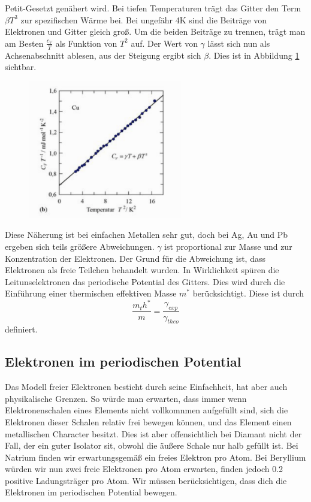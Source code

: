 \documentclass[11pt]{article}
\begin{document}
Petit-Gesetzt genähert wird. Bei tiefen Temperaturen trägt das Gitter den Term
$\beta T^3$ zur spezifischen Wärme bei. Bei ungefähr 4K sind die Beiträge von
Elektronen und Gitter gleich groß. Um die beiden Beiträge zu trennen, trägt man
am Besten $\frac{c_V}{T}$ als Funktion von $T^2$ auf. Der Wert von $\gamma$
lässt sich nun als Achsenabschnitt ablesen, aus der Steigung ergibt sich
$\beta$. Dies ist in Abbildung \ref{fig:spezifische2} sichtbar.
\begin{figure}[h]
\includegraphics[width=0.6\textwidth]{spezifische2}
\centering
\label{fig:spezifische2}
\end{figure}
Diese Näherung ist bei einfachen Metallen sehr gut, doch bei Ag, Au und Pb
ergeben sich teils größere Abweichungen. $\gamma$ ist proportional zur Masse und
zur Konzentration der Elektronen. Der Grund für die Abweichung ist, dass
Elektronen als freie Teilchen behandelt wurden. In Wirklichkeit spüren die
Leitunselektronen das periodische Potential des Gitters. Dies wird durch die
Einführung einer thermischen effektiven Masse $m^*$ berücksichtigt. Diese ist
durch
\begin{equation}
  \frac{m_th^*}{m}=\frac{\gamma_{exp}}{\gamma_{theo}}
\end{equation}
definiert.
\subsection{Elektronen im periodischen Potential}
Das Modell freier Elektronen besticht durch seine Einfachheit, hat aber auch
physikalische Grenzen. So würde man erwarten, dass immer wenn Elektronenschalen
eines Elements nicht vollkomnmen aufgefüllt sind, sich die Elektronen dieser
Schalen relativ frei bewegen können, und das Element einen metallischen
Character besitzt. Dies ist aber offensichtlich bei Diamant nicht der Fall, der
ein guter Isolator sit, obwohl die äußere Schale nur halb gefüllt ist. Bei
Natrium finden wir erwartungsgemäß ein freies Elektron pro Atom. Bei Beryllium
würden wir nun zwei freie Elektronen pro Atom erwarten, finden jedoch 0.2
positive Ladungsträger pro Atom. Wir müssen berücksichtigen, dass dich die
Elektronen im periodischen Potential bewegen.
\end{document}
